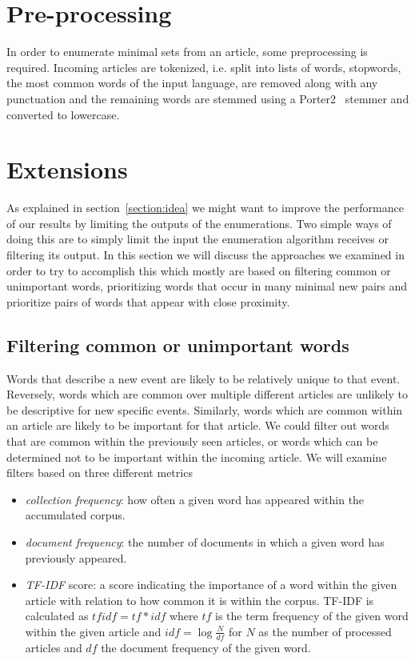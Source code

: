 \section{Pre-processing}
\label{method:preprocessing}
In order to enumerate minimal sets from an article, some preprocessing is required. Incoming articles are tokenized, i.e. split into lists of words, stopwords, the most common words of the input language, are removed along with any punctuation and the remaining words are stemmed using a Porter2~\cite{porter2002english} stemmer and converted to lowercase.

\section{Extensions}
As explained in section~\ref{section:idea} we might want to improve the performance of our results by limiting the outputs of the enumerations. Two simple ways of doing this are to simply limit the input the enumeration algorithm receives or filtering its output.
In this section we will discuss the approaches we examined in order to try to accomplish this which mostly are based on filtering common or unimportant words, prioritizing words that occur in many minimal new pairs and prioritize pairs of words that appear with close proximity.

\subsection{Filtering common or unimportant words}
Words that describe a new event are likely to be relatively unique to that event. Reversely, words which are common over multiple different articles are unlikely to be descriptive for new specific events. Similarly, words which are common within an article are likely to be important for that article. We could filter out words that are common within the previously seen articles, or words which can be determined not to be important within the incoming article. We will examine filters based on three different metrics
\begin{itemize}
  \item \emph{collection frequency}: how often a given word has appeared within the accumulated corpus.
  \item \emph{document frequency}: the number of documents in which a given word has previously appeared.
  \item \emph{TF-IDF} score: a score indicating the importance of a word within the given article with relation to how common it is within the corpus. TF-IDF is calculated as $tfidf = tf*idf$ where $tf$ is the term frequency of the given word within the given article and $idf = \log{\frac{N}{df}}$ for $N$ as the number of processed articles and $df$ the document frequency of the given word.
\end{itemize}

